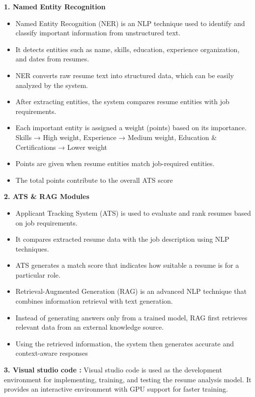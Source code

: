 \noindent \textbf{1. Named Entity Recognition}
\begin{itemize}
    \item  Named Entity Recognition (NER) is an NLP technique used to identify and classify important information from unstructured text.
    \item It detects entities such as name, skills, education, experience organization, and dates from resumes.
    \item NER converts raw resume text into structured data, which can be easily analyzed by the system.
    \item After extracting entities, the system compares resume entities with job requirements.
    \item Each important entity is assigned a weight (points) based on its importance.
            \noindent Skills → High weight,
            \noindent Experience → Medium weight,
            \noindent Education \& Certifications → Lower weight
    \item Points are given when resume entities match job-required entities.
    \item The total points contribute to the overall ATS score
\end{itemize}
\vspace{6pt}
\noindent \textbf{2. ATS \& RAG Modules}
\begin{itemize}
    \item Applicant Tracking System (ATS) is used to evaluate and rank resumes based on job requirements.
    \item It compares extracted resume data with the job description using NLP techniques.
    \item ATS generates a match score that indicates how suitable a resume is for a particular role.
    \item Retrieval-Augmented Generation (RAG) is an advanced NLP technique     that combines information retrieval with text generation.
    \item Instead of generating answers only from a trained model, RAG first retrieves relevant data from an external knowledge source.
    \item Using the retrieved information, the system then generates accurate and context-aware responses
\end{itemize}
\noindent\textbf{3. Visual studio code :} 
Visual studio code is used as the development environment for implementing, training, and testing the resume analysis model. It provides an interactive environment with GPU support for faster training.


